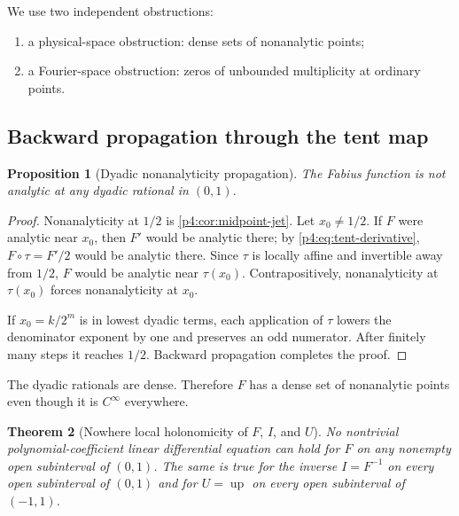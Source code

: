 \documentclass[11pt]{article}
\numberwithin{equation}{section}
\newtheorem{theorem}{Theorem}[section]
\newtheorem{proposition}[theorem]{Proposition}
\theoremstyle{definition}
\theoremstyle{remark}
\newcommand{\Up}{\operatorname{up}}
\begin{document}
We use two independent obstructions:
\begin{enumerate}
\item a physical-space obstruction: dense sets of nonanalytic points;
\item a Fourier-space obstruction: zeros of unbounded multiplicity at ordinary points.
\end{enumerate}

\subsection{Backward propagation through the tent map}
\begin{proposition}[Dyadic nonanalyticity propagation]
\label{p4:prop:dyadic-nonanalyticity}
The Fabius function is not analytic at any dyadic rational in $(0,1)$.
\end{proposition}

\begin{proof}
Nonanalyticity at $1/2$ is \cref{p4:cor:midpoint-jet}.  Let $x_0\ne1/2$.  If $F$ were analytic near $x_0$, then $F'$ would be analytic there; by \eqref{p4:eq:tent-derivative}, $F\circ\tau=F'/2$ would be analytic there.  Since $\tau$ is locally affine and invertible away from $1/2$, $F$ would be analytic near $\tau(x_0)$.  Contrapositively, nonanalyticity at $\tau(x_0)$ forces nonanalyticity at $x_0$.

If $x_0=k/2^m$ is in lowest dyadic terms, each application of $\tau$ lowers the denominator exponent by one and preserves an odd numerator.  After finitely many steps it reaches $1/2$.  Backward propagation completes the proof.
\end{proof}

The dyadic rationals are dense.  Therefore $F$ has a dense set of nonanalytic points even though it is $C^\infty$ everywhere.

\begin{theorem}[Nowhere local holonomicity of $F$, $I$, and $U$]
\label{p4:thm:physical-nondfinite}
No nontrivial polynomial-coefficient linear differential equation can hold for $F$ on any nonempty open subinterval of $(0,1)$.  The same is true for the inverse $I=F^{-1}$ on every open subinterval of $(0,1)$ and for $U=\Up$ on every open subinterval of $(-1,1)$.
\end{theorem}
\end{document}
